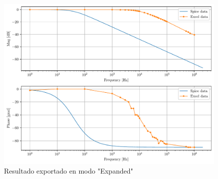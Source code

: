 \begin{figure}[ht]
\centering
\includegraphics[scale=0.7]{resources/expExport.pdf}
\caption{Resultado exportado en modo "Expanded"}
\label{fig:expExport}
\end{figure}
